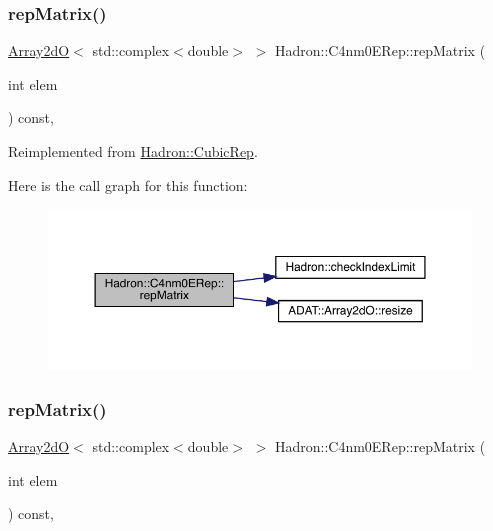 \subsubsection{\texorpdfstring{repMatrix()}{repMatrix()}\hspace{0.1cm}{\footnotesize\ttfamily [1/3]}}
{\footnotesize\ttfamily \mbox{\hyperlink{classADAT_1_1Array2dO}{Array2dO}}$<$ std\+::complex$<$double$>$ $>$ Hadron\+::\+C4nm0\+E\+Rep\+::rep\+Matrix (\begin{DoxyParamCaption}\item[{int}]{elem }\end{DoxyParamCaption}) const\hspace{0.3cm}{\ttfamily [inline]}, {\ttfamily [virtual]}}



Reimplemented from \mbox{\hyperlink{structHadron_1_1CubicRep_ac5d7e9e6f4ab1158b5fce3e4ad9e8005}{Hadron\+::\+Cubic\+Rep}}.

Here is the call graph for this function\+:
\nopagebreak
\begin{figure}[H]
\begin{center}
\leavevmode
\includegraphics[width=350pt]{d3/d8a/structHadron_1_1C4nm0ERep_aa9353c0f2a226224911c51db6f647ccf_cgraph}
\end{center}
\end{figure}
\mbox{\label{structHadron_1_1C4nm0ERep_aa9353c0f2a226224911c51db6f647ccf}} 
\subsubsection{\texorpdfstring{repMatrix()}{repMatrix()}\hspace{0.1cm}{\footnotesize\ttfamily [2/3]}}
{\footnotesize\ttfamily \mbox{\hyperlink{classADAT_1_1Array2dO}{Array2dO}}$<$ std\+::complex$<$double$>$ $>$ Hadron\+::\+C4nm0\+E\+Rep\+::rep\+Matrix (\begin{DoxyParamCaption}\item[{int}]{elem }\end{DoxyParamCaption}) const\hspace{0.3cm}{\ttfamily [inline]}, {\ttfamily [virtual]}}



